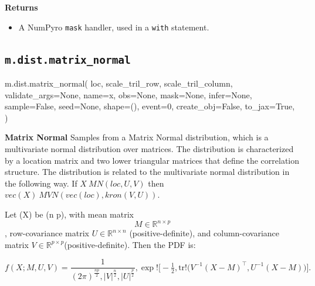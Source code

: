 \documentclass[
  letterpaper,
  DIV=11,
  numbers=noendperiod]{scrartcl}
\newenvironment{Shaded}{\begin{snugshade}}{\end{snugshade}}
\newcommand{\DecValTok}[1]{\textcolor[rgb]{0.68,0.00,0.00}{#1}}
\newcommand{\NormalTok}[1]{\textcolor[rgb]{0.00,0.23,0.31}{#1}}
\newcommand{\OperatorTok}[1]{\textcolor[rgb]{0.37,0.37,0.37}{#1}}
\newcommand{\StringTok}[1]{\textcolor[rgb]{0.13,0.47,0.30}{#1}}
\newcommand{\VariableTok}[1]{\textcolor[rgb]{0.07,0.07,0.07}{#1}}
\providecommand{\tightlist}{%
  \setlength{\itemsep}{0pt}\setlength{\parskip}{0pt}}\usepackage{longtable,booktabs,array}
\begin{document}
\textbf{Returns}

\begin{itemize}
\tightlist
\item
  A NumPyro \texttt{mask} handler, used in a \texttt{with} statement.
\end{itemize}

\subsection{\texorpdfstring{\texttt{m.dist.matrix\_normal}}{m.dist.matrix\_normal}}\label{matrix_normal}

\begin{Shaded}
\begin{Highlighting}[]
\NormalTok{m.dist.matrix\_normal(}
\NormalTok{    loc,}
\NormalTok{    scale\_tril\_row,}
\NormalTok{    scale\_tril\_column,}
\NormalTok{    validate\_args}\OperatorTok{=}\VariableTok{None}\NormalTok{,}
\NormalTok{    name}\OperatorTok{=}\StringTok{\textquotesingle{}x\textquotesingle{}}\NormalTok{,}
\NormalTok{    obs}\OperatorTok{=}\VariableTok{None}\NormalTok{,}
\NormalTok{    mask}\OperatorTok{=}\VariableTok{None}\NormalTok{,}
\NormalTok{    infer}\OperatorTok{=}\VariableTok{None}\NormalTok{,}
\NormalTok{    sample}\OperatorTok{=}\VariableTok{False}\NormalTok{,}
\NormalTok{    seed}\OperatorTok{=}\VariableTok{None}\NormalTok{,}
\NormalTok{    shape}\OperatorTok{=}\NormalTok{(),}
\NormalTok{    event}\OperatorTok{=}\DecValTok{0}\NormalTok{,}
\NormalTok{    create\_obj}\OperatorTok{=}\VariableTok{False}\NormalTok{,}
\NormalTok{    to\_jax}\OperatorTok{=}\VariableTok{True}\NormalTok{,}
\NormalTok{)}
\end{Highlighting}
\end{Shaded}

\textbf{Matrix Normal} Samples from a Matrix Normal distribution, which
is a multivariate normal distribution over matrices. The distribution is
characterized by a location matrix and two lower triangular matrices
that define the correlation structure. The distribution is related to
the multivariate normal distribution in the following way. If
\(X ~ MN(loc,U,V)\) then \(vec(X) ~ MVN(vec(loc), kron(V,U) )\).

Let (X) be (n \times p), with mean matrix \[M\in\mathbb R^{n\times p}\],
row-covariance matrix \(U\in\mathbb R^{n\times n}\) (positive-definite),
and column-covariance matrix
\(V\in\mathbb R^{p\times p}\)(positive-definite). Then the PDF is:

\[
  f(X;M,U,V) = \frac{1}{(2\pi)^{\tfrac{np}{2}},|V|^{\tfrac n2},|U|^{\tfrac p2}},
  \exp!\Big[-\tfrac12,\mathrm{tr}!\big( V^{-1}(X-M)^\top,U^{-1}(X-M)\big)\Big].
  \]
\end{document}

